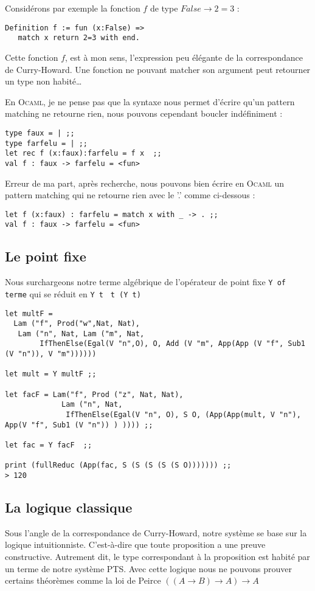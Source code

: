 Considérons par exemple la fonction $f$ de type $False \rightarrow 2=3$ :
\begin{Verbatim}
Definition f := fun (x:False) => 
   match x return 2=3 with end.
\end{Verbatim}
Cette fonction $f$, est à mon sens, l'expression peu élégante de la correspondance 
de Curry-Howard. Une fonction ne pouvant matcher son argument peut retourner un type non habité\dots

En \textsc{Ocaml}, je ne pense pas que la syntaxe nous permet d'écrire qu'un pattern matching
ne retourne rien, nous pouvons cependant boucler indéfiniment :
\begin{Verbatim} 
type faux = | ;;
type farfelu = | ;;
let rec f (x:faux):farfelu = f x  ;;
val f : faux -> farfelu = <fun>
\end{Verbatim}

Erreur de ma part, après recherche, nous pouvons bien écrire en \textsc{Ocaml} un pattern matching
qui ne retourne rien avec le '.' comme ci-dessous :
\begin{Verbatim}
let f (x:faux) : farfelu = match x with _ -> . ;;
val f : faux -> farfelu = <fun>
\end{Verbatim}

\subsection{Le point fixe}
Nous surchargeons notre terme algébrique de l'opérateur de point fixe \verb+Y of terme+ qui
se réduit en \verb+Y t+ \imp\ \verb+t (Y t)+
\begin{Verbatim}
let multF = 
  Lam ("f", Prod("w",Nat, Nat),
   Lam ("n", Nat, Lam ("m", Nat, 
        IfThenElse(Egal(V "n",O), O, Add (V "m", App(App (V "f", Sub1 (V "n")), V "m"))))))

let mult = Y multF ;;

let facF = Lam("f", Prod ("z", Nat, Nat), 
             Lam ("n", Nat,
              IfThenElse(Egal(V "n", O), S O, (App(App(mult, V "n"), App(V "f", Sub1 (V "n")) ) )))) ;;

let fac = Y facF  ;;

print (fullReduc (App(fac, S (S (S (S (S O))))))) ;;
> 120
\end{Verbatim}

\subsection{La logique classique}
Sous l'angle de la correspondance de Curry-Howard, notre système se base sur la logique intuitionniste.
C'est-à-dire que toute proposition a une preuve constructive.
 Autrement dit, le type correspondant à la proposition est habité par un terme de notre système PTS.
Avec cette logique nous ne pouvons prouver certains théorèmes comme la loi de Peirce $((A\rightarrow B)\rightarrow A)\rightarrow A$

